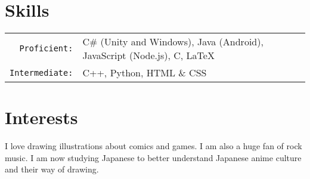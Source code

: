 \documentclass[12pt, letterpaper]{article}
\begin{document}
\smallskip

\section{Skills}
\smallskip
\noindent
\begin{tabularx}{\linewidth}{r X}
	\texttt{Proficient:} & C\# (Unity and Windows), Java (Android), JavaScript (Node.js), C, \LaTeX \\
	\texttt{Intermediate:} & C++, Python, HTML \& CSS
\end{tabularx}

\smallskip

\section{Interests}
\smallskip
\noindent
I love drawing illustrations about comics and games. I am also a huge fan of rock music. I am now studying Japanese to better understand Japanese anime culture and their way of drawing.
\end{document}
